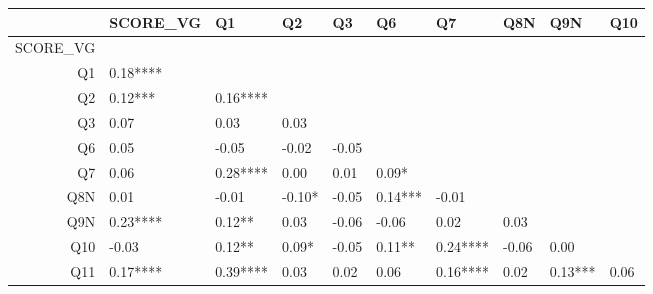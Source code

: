\begin{table}[ht]
\centering
\begin{tabular}{rlllllllll}
  \hline
 & SCORE\_VG & Q1 & Q2 & Q3 & Q6 & Q7 & Q8N & Q9N & Q10 \\ 
  \hline
SCORE\_VG &  &  &  &  &  &  &  &  &  \\ 
  Q1 &  0.18**** &  &  &  &  &  &  &  &  \\ 
  Q2 &  0.12***  &  0.16**** &  &  &  &  &  &  &  \\ 
  Q3 &  0.07     &  0.03     &  0.03     &  &  &  &  &  &  \\ 
  Q6 &  0.05     & -0.05     & -0.02     & -0.05     &  &  &  &  &  \\ 
  Q7 &  0.06     &  0.28**** &  0.00     &  0.01     &  0.09*    &  &  &  &  \\ 
  Q8N &  0.01     & -0.01     & -0.10*    & -0.05     &  0.14***  & -0.01     &  &  &  \\ 
  Q9N &  0.23**** &  0.12**   &  0.03     & -0.06     & -0.06     &  0.02     &  0.03     &  &  \\ 
  Q10 & -0.03     &  0.12**   &  0.09*    & -0.05     &  0.11**   &  0.24**** & -0.06     &  0.00     &  \\ 
  Q11 &  0.17**** &  0.39**** &  0.03     &  0.02     &  0.06     &  0.16**** &  0.02     &  0.13***  &  0.06     \\ 
   \hline
\end{tabular}
\end{table}
